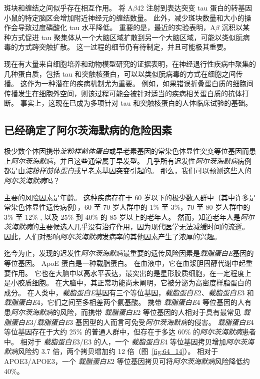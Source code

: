 斑块和缠结之间似乎存在相互作用。
将 A$\beta$42 注射到表达突变 tau 蛋白的转基因小鼠的特定脑区会增加附近神经元的缠结数量。
此外，减少斑块数量和大小的操作会导致过度磷酸化 tau 水平降低。
重要的是，最近的实验表明，A$\beta$ 沉积以某种方式促进 tau 聚集体从一个大脑区域扩散到另一个大脑区域，可能以类似朊病毒的方式跨突触扩散。
这一过程的细节仍有待制定，并且可能极其重要。


现在有大量来自细胞培养和动物模型研究的证据表明，在神经退行性疾病中聚集的几种蛋白质，包括 tau 和突触核蛋白，可以以类似朊病毒的方式在细胞之间传播。
这作为一种潜在的疾病机制尤为重要。
例如，如果错误折叠蛋白质的细胞间传播发生在细胞外空间，则该过程可能会被针对适当的疾病相关蛋白质的抗体打断。
事实上，这现在已成为多项针对 tau 和突触核蛋白的人体临床试验的基础。



\subsection{已经确定了阿尔茨海默病的危险因素}

极少数个体因携带\textit{淀粉样前体蛋白}或早老素基因的常染色体显性突变等位基因而患上\textit{阿尔茨海默病}，并且这些通常属于早发型。
几乎所有迟发性\textit{阿尔茨海默病}病例都是由\textit{淀粉样前体蛋白}或早老素基因突变引起的。
那么，我们可以预测这些人的\textit{阿尔茨海默病}吗？


主要的风险因素是年龄。
这种疾病存在于 60 岁以下的极少数人群中（其中许多是常染色体显性遗传病例），60 至 70 岁人群中的 1\% 至 3\%，70 至 80 岁人群中的 3\% 至 12\% , 以及 25\% 到 40\% 的 85 岁以上的老年人。
然而，知道老年人是\textit{阿尔茨海默病}的主要候选人几乎没有治疗作用，因为现代医学无法减缓时间的流逝。
因此，人们对影响\textit{阿尔茨海默病}发病率的其他因素产生了浓厚的兴趣。


迄今为止，发现的迟发性\textit{阿尔茨海默病}最重要的遗传风险因素是\textit{载脂蛋白E}基因的等位基因。
ApoE 蛋白是一种载脂蛋白。
在血液中，它在血浆胆固醇代谢中起重要作用。
它也在大脑中以高水平表达，最突出的是星形胶质细胞，在一定程度上是小胶质细胞。
在大脑中，其正常功能尚未阐明，它被分泌为高密度样脂蛋白的成分。
在人类中，\textit{载脂蛋白E}基因有三个等位基因，\textit{载脂蛋白E}2、\textit{载脂蛋白E}3 和 \textit{载脂蛋白E}4，它们之间至多相差两个氨基酸。
携带 \textit{载脂蛋白E}4 等位基因的人有患\textit{阿尔茨海默病}的风险，而携带 \textit{载脂蛋白E}2 等位基因的人相对于具有最常见 \textit{载脂蛋白E}3/\textit{载脂蛋白E}3 基因型的人而言可免受\textit{阿尔茨海默病}的侵害。
\textit{载脂蛋白E}4 等位基因存在于大约 25\% 的普通人群中，但存在于多达 60\% 的\textit{阿尔茨海默病}患者中。
相对于 \textit{载脂蛋白E}3/E3 的人，一个 \textit{载脂蛋白E}4 等位基因拷贝增加\textit{阿尔茨海默病}风险约 3.7 倍，两个拷贝增加约 12 倍（图~\ref{fig:64_14}）。
相对于 APOE3/APOE3，一个 \textit{载脂蛋白E}2 等位基因拷贝可将\textit{阿尔茨海默病}风险降低约 40\%。



